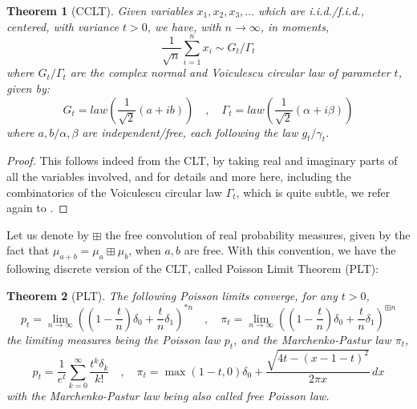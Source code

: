 \documentclass[12pt]{amsbook}
\newtheorem{theorem}{Theorem}[chapter]
\begin{document}

\begin{theorem}[CCLT]
Given variables $x_1,x_2,x_3,\ldots$ which are i.i.d./f.i.d., centered, with variance $t>0$, we have, with $n\to\infty$, in moments,
$$\frac{1}{\sqrt{n}}\sum_{i=1}^nx_i\sim G_t/\Gamma_t$$
where $G_t/\Gamma_t$ are the complex normal and Voiculescu circular law of parameter $t$, given by:
$$G_t=law\left(\frac{1}{\sqrt{2}}(a+ib)\right)\quad,\quad 
\Gamma_t=law\left(\frac{1}{\sqrt{2}}(\alpha+i\beta)\right)$$
where $a,b/\alpha,\beta$ are independent/free, each following the law $g_t/\gamma_t$.
\end{theorem}

\begin{proof}
This follows indeed from the CLT, by taking real and imaginary parts of all the variables involved, and for details and more here, including the combinatorics of the Voiculescu circular law $\Gamma_t$, which is quite subtle, we refer again to \cite{vdn}.
\end{proof}

Let us denote by $\boxplus$ the free convolution of real probability measures, given by the fact that $\mu_{a+b}=\mu_a\boxplus\mu_b$, when $a,b$ are free. With this convention, we have the following discrete version of the CLT, called Poisson Limit Theorem (PLT):


\begin{theorem}[PLT]
The following Poisson limits converge, for any $t>0$,
$$p_t=\lim_{n\to\infty}\left(\left(1-\frac{t}{n}\right)\delta_0+\frac{t}{n}\delta_1\right)^{*n}\quad,\quad 
\pi_t=\lim_{n\to\infty}\left(\left(1-\frac{t}{n}\right)\delta_0+\frac{t}{n}\delta_1\right)^{\boxplus n}$$
the limiting measures being the Poisson law $p_t$, and the Marchenko-Pastur law $\pi_t$,
$$p_t=\frac{1}{e^t}\sum_{k=0}^\infty\frac{t^k\delta_k}{k!}\quad,\quad 
\pi_t=\max(1-t,0)\delta_0+\frac{\sqrt{4t-(x-1-t)^2}}{2\pi x}\,dx$$
with the Marchenko-Pastur law being also called free Poisson law. 
\end{theorem}
\end{document}
